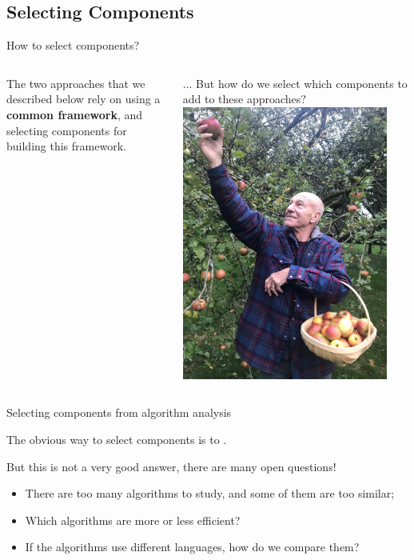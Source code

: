 \documentclass[aspectratio=169]{beamer}
\begin{document}
\subsection{Selecting Components}
\begin{frame}{How to select components?}
  \begin{columns}
    The two approaches that we described below rely on using a {\bf
      common framework}, and selecting components for building this
    framework.\bigskip

    ... But how do we select which components to add to these approaches?
    \includegraphics[width=0.9\textwidth]{img/selecting_components.jpg}
  \end{columns}
\end{frame}

\begin{frame}{Selecting components from algorithm analysis}

  The obvious way to select components is to .\bigskip

  But this is not a very good answer, there are many open questions!
  \begin{itemize}
  \item There are too many algorithms to study, and some of them are too similar;
  \item Which algorithms are more or less efficient?
  \item If the algorithms use different languages, how do we compare them?
  \end{itemize}
\end{frame}
\end{document}
